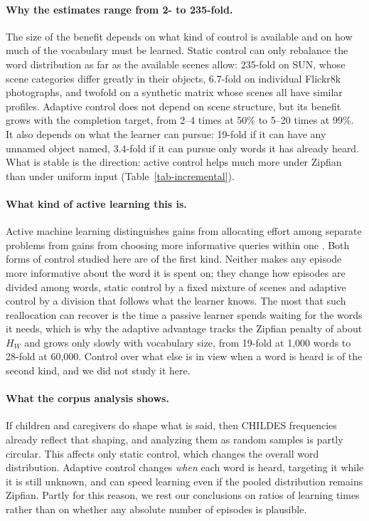 \documentclass[a4paper,natbib,man]{apa6}
\begin{document}
\paragraph{Why the estimates range from 2- to 235-fold.} The size of the benefit depends on what kind of control is available and on how much of the vocabulary must be learned. Static control can only rebalance the word distribution as far as the available scenes allow: 235-fold on SUN, whose scene categories differ greatly in their objects, 6.7-fold on individual Flickr8k photographs, and twofold on a synthetic matrix whose scenes all have similar profiles. Adaptive control does not depend on scene structure, but its benefit grows with the completion target, from 2--4 times at 50\% to 5--20 times at 99\%. It also depends on what the learner can pursue: 19-fold if it can have any unnamed object named, 3.4-fold if it can pursue only words it has already heard. What is stable is the direction: active control helps much more under Zipfian than under uniform input (Table~\ref{tab-incremental}).

\paragraph{What kind of active learning this is.} Active machine learning distinguishes gains from allocating effort among separate problems from gains from choosing more informative queries within one \citep{Settles:2012}. Both forms of control studied here are of the first kind. Neither makes any episode more informative about the word it is spent on; they change how episodes are divided among words, static control by a fixed mixture of scenes and adaptive control by a division that follows what the learner knows. The most that such reallocation can recover is the time a passive learner spends waiting for the words it needs, which is why the adaptive advantage tracks the Zipfian penalty of about $H_W$ and grows only slowly with vocabulary size, from 19-fold at 1,000 words to 28-fold at 60,000. Control over what else is in view when a word is heard is of the second kind, and we did not study it here.

\paragraph{What the corpus analysis shows.} If children and caregivers do shape what is said, then CHILDES frequencies already reflect that shaping, and analyzing them as random samples is partly circular. This affects only static control, which changes the overall word distribution. Adaptive control changes \textit{when} each word is heard, targeting it while it is still unknown, and can speed learning even if the pooled distribution remains Zipfian. Partly for this reason, we rest our conclusions on ratios of learning times rather than on whether any absolute number of episodes is plausible.
\end{document}
